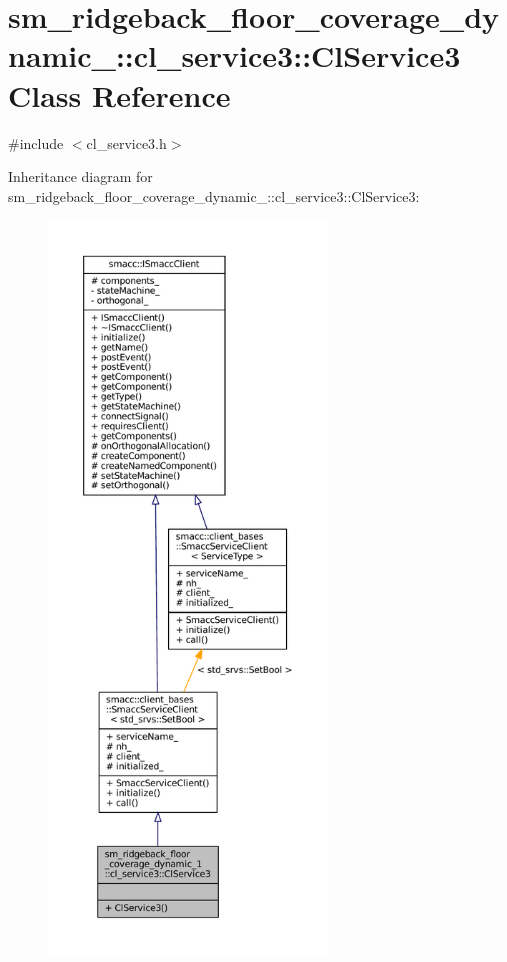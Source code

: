 \hypertarget{classsm__ridgeback__floor__coverage__dynamic__1_1_1cl__service3_1_1ClService3}{}\section{sm\+\_\+ridgeback\+\_\+floor\+\_\+coverage\+\_\+dynamic\+\_\+:\+:cl\+\_\+service3\+:\+:Cl\+Service3 Class Reference}
\label{classsm__ridgeback__floor__coverage__dynamic__1_1_1cl__service3_1_1ClService3}


{\ttfamily \#include $<$cl\+\_\+service3.\+h$>$}



Inheritance diagram for sm\+\_\+ridgeback\+\_\+floor\+\_\+coverage\+\_\+dynamic\+\_\+:\+:cl\+\_\+service3\+:\+:Cl\+Service3\+:
\nopagebreak
\begin{figure}[H]
\begin{center}
\leavevmode
\includegraphics[height=550pt]{classsm__ridgeback__floor__coverage__dynamic__1_1_1cl__service3_1_1ClService3__inherit__graph}
\end{center}
\end{figure}


